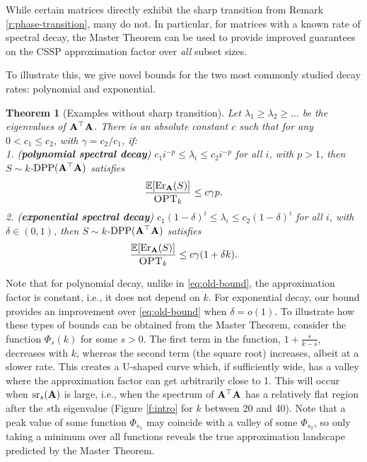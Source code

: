 \documentclass{article}
\newtheorem{theorem}{Theorem}
\begin{document}
While certain matrices directly exhibit the sharp transition from
Remark \ref{r:phase-transition}, many do not. In particular, for
matrices with a known rate of spectral decay, the Master Theorem can
be used to provide improved guarantees on the CSSP approximation
factor over \emph{all} subset sizes. 

To illustrate this, we give novel bounds
for the two most commonly studied decay rates:  polynomial and exponential.
\begin{theorem}[Examples without sharp transition]\label{t:decay}
Let $\lambda_1\!\geq\!\lambda_2\!\geq\!...$ be the
eigenvalues of $\mathbf A^\top\mathbf A$. There is an absolute constant $c$ such that
for any $0\!<\!c_1\!\leq\!c_2$, with $\gamma=c_2/c_1$, if:\\[2mm]
\textnormal{1.} (\textbf{polynomial spectral decay}) $c_1i^{-p}\!\leq\!
  \lambda_i\!\leq\! c_2i^{-p}$ for all $i$, with $p>1$, then $S\sim
k$-${\mathrm{DPP}}(\mathbf A^\top\mathbf A)$ satisfies
  \begin{align*}
    \frac{\mathbb E[\mathrm{Er}_\mathbf A(S)]}{{\textsc{OPT}_k}}\leq c \gamma p. 
  \end{align*}
\textnormal{2.} (\textbf{exponential spectral decay}) $c_1(1\!-\!\delta)^{i}\leq \lambda_i\leq
  c_2(1\!-\!\delta)^{i}$ for all $i$, with $\delta\in(0,1)$, then $S\sim
k$-${\mathrm{DPP}}(\mathbf A^\top\mathbf A)$ satisfies %
  \begin{align*}
    \frac{\mathbb E[\mathrm{Er}_\mathbf A(S)]}{{\textsc{OPT}_k}}\leq c\gamma(1+ \delta k).
  \end{align*}
\end{theorem}
Note that for polynomial decay, unlike in \eqref{eq:old-bound}, the
approximation factor is constant, i.e., it does not depend on $k$. For
exponential decay, our bound provides an improvement over
\eqref{eq:old-bound} when $\delta=o(1)$.
To illustrate how these types of bounds can be obtained from the
Master Theorem, consider the function $\Phi_s(k)$ for some
$s>0$. The first term in the function, $1+\frac{s}{k-s}$, decreases with $k$, whereas
the second term (the square root) increases, albeit at a slower rate. This creates a
U-shaped curve which, if sufficiently wide, has a valley where the
approximation factor can get arbitrarily close to 1. This will occur
when ${\mathrm{sr}}_s(\mathbf A)$ is large, i.e., when the spectrum of $\mathbf A^\top\mathbf A$ has
a relatively flat region after the $s$th eigenvalue (Figure \ref{f:intro}
for $k$ between 20 and 40). Note that a peak value of some function
$\Phi_{s_1}$ may coincide with a valley of some $\Phi_{s_2}$, so only
taking a minimum over all functions reveals the true approximation
landscape predicted by the Master Theorem. 
\end{document}

